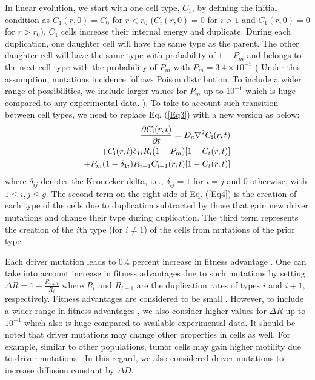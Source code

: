 \documentclass[aps,prl, superscriptaddress,groupedaddress]{revtex4}  %
\begin{document}
	 In linear evolution, we start with one cell type, $C_1$, by defining the initial condition as $C_1(r, 0) =C_0$ for $r<r_0$ ($C_i(r, 0)=0$ for $i>1$ and $C_1(r,0)=0$ for $r>r_0$).  $C_1$ cells increase their internal energy and duplicate. During each duplication, one daughter cell will have the same type as the parent. The other daughter cell will have the same type with probability of $1- P_m$ and belongs to the next cell type with the probability of $P_m$ with $P_m=3.4\times 10^{-5} $ (  Under this assumption, mutations incidence follows Poison distribution. To include a wider range of possibilities, we include  larger values for $P_m$ up to $10^{-1}$ which is huge compared to any experimental data. ). To take to account such transition between cell types, we need to replace Eq. (\ref{Eq3}) with a new version as below:
	\begin{eqnarray}
		\frac{\partial C_{\rm i}(r,t)}{\partial t}
		= D_c\nabla^2 C_{\rm i}(r,t)\nonumber \\
		+ C_{\rm i}(r,t) \delta_{1i}R_i (1-P_m) [1-C_t(r,t)]  \nonumber \\
		+ P_m (1-\delta_{1i})R_{i-1} C_{\rm i-1}(r,t)[1-C_t(r,t)] 
		\label{Eq4}
	\end{eqnarray}
	where $\delta_{ij}$ denotes the Kronecker delta, i.e., $\delta_{ij}=1$ for $i=j$ and $0$ otherwise, with $1\leq i,j\leq g$. The second term on the right side of Eq. (\ref{Eq4}) is the creation of each type of the cells due to duplication subtracted by those that gain new driver mutations and change their type during duplication. The third term represents the creation of the $i$th type (for $i \ne 1$) of the cells from mutations of the prior type.
	
	Each driver mutation leads to $0.4$ percent increase in fitness advantage \cite{bozic2010accumulation}.  One can take into account increase in fitness advantages due to such mutations  by setting $\Delta R=1- \frac{R_{i+1}}{R_{i}}$ where $R_{i}$ and $R_{i+1}$ are the duplication rates of types $i$ and $i+1$, respectively. Fitness advantages are considered to be small \cite{heide2018reply}. However, to include a wider range in fitness advantages \cite{castro2015mini, vermeulen2013defining, mcfarland2014tug}, we also consider higher values for $\Delta R$ up to $10^{-1}$ which also is huge compared to available experimental data. It should be noted that driver mutations may change other properties in cells as well. For example, similar to other populations, tumor cells may gain higher motility due to driver mutations \cite{benichou2012front}. In this regard, we also considered driver mutations to increase diffusion constant by $\Delta D$.  
	
\end{document}

